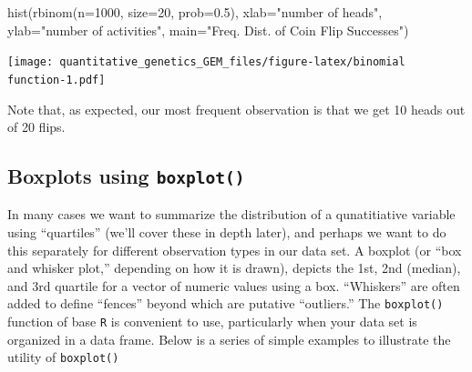 \documentclass[
]{book}
\newenvironment{Shaded}{\begin{snugshade}}{\end{snugshade}}
\newcommand{\AttributeTok}[1]{\textcolor[rgb]{0.77,0.63,0.00}{#1}}
\newcommand{\DecValTok}[1]{\textcolor[rgb]{0.00,0.00,0.81}{#1}}
\newcommand{\DocumentationTok}[1]{\textcolor[rgb]{0.56,0.35,0.01}{\textbf{\textit{#1}}}}
\newcommand{\FloatTok}[1]{\textcolor[rgb]{0.00,0.00,0.81}{#1}}
\newcommand{\FunctionTok}[1]{\textcolor[rgb]{0.00,0.00,0.00}{#1}}
\newcommand{\NormalTok}[1]{#1}
\newcommand{\OtherTok}[1]{\textcolor[rgb]{0.56,0.35,0.01}{#1}}
\newcommand{\SpecialCharTok}[1]{\textcolor[rgb]{0.00,0.00,0.00}{#1}}
\newcommand{\StringTok}[1]{\textcolor[rgb]{0.31,0.60,0.02}{#1}}
\begin{document}
\begin{Shaded}
\begin{Highlighting}[]
\FunctionTok{hist}\NormalTok{(}\FunctionTok{rbinom}\NormalTok{(}\AttributeTok{n=}\DecValTok{1000}\NormalTok{, }\AttributeTok{size=}\DecValTok{20}\NormalTok{, }\AttributeTok{prob=}\FloatTok{0.5}\NormalTok{), }\AttributeTok{xlab=}\StringTok{"number of heads"}\NormalTok{, }\AttributeTok{ylab=}\StringTok{"number of activities"}\NormalTok{,}
     \AttributeTok{main=}\StringTok{"Freq. Dist. of Coin Flip Successes"}\NormalTok{)}
\end{Highlighting}
\end{Shaded}

\texttt{[image: quantitative\_genetics\_GEM\_files/figure-latex/binomial function-1.pdf]}

Note that, as expected, our most frequent observation is that we get 10 heads out of 20 flips.

\hypertarget{boxplots-using-boxplot}{%
\subsection{\texorpdfstring{Boxplots using \texttt{boxplot()}}{Boxplots using boxplot()}}\label{boxplots-using-boxplot}}

In many cases we want to summarize the distribution of a qunatitiative variable using ``quartiles'' (we'll cover these in depth later), and perhaps we want to do this separately for different observation types in our data set. A boxplot (or ``box and whisker plot,'' depending on how it is drawn), depicts the 1st, 2nd (median), and 3rd quartile for a vector of numeric values using a box. ``Whiskers'' are often added to define ``fences'' beyond which are putative ``outliers.'' The \texttt{boxplot()} function of base \texttt{R} is convenient to use, particularly when your data set is organized in a data frame. Below is a series of simple examples to illustrate the utility of \texttt{boxplot()}

\begin{Shaded}
\end{Shaded}
\end{document}
